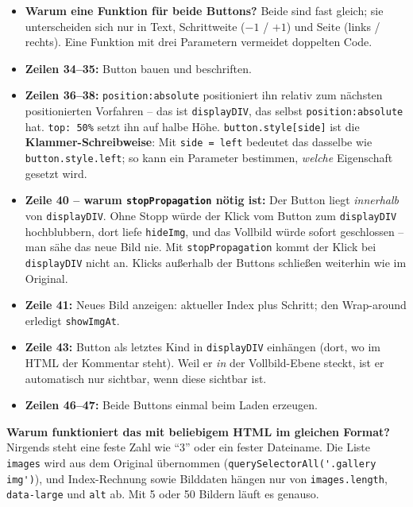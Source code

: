 \documentclass[a4paper,11pt]{article}
\begin{document}
\begin{itemize}
\item \textbf{Warum eine Funktion für beide Buttons?} Beide sind fast gleich; sie unterscheiden sich nur in Text,
      Schrittweite ($-1$ / $+1$) und Seite (links / rechts). Eine Funktion mit drei Parametern vermeidet doppelten Code.
\item \textbf{Zeilen 34--35:} Button bauen und beschriften.
\item \textbf{Zeilen 36--38:} \texttt{position:absolute} positioniert ihn relativ zum nächsten positionierten Vorfahren
      -- das ist \texttt{displayDIV}, das selbst \texttt{position:absolute} hat. \texttt{top: 50\%} setzt ihn auf halbe
      Höhe. \lstinline|button.style[side]| ist die \textbf{Klammer-Schreibweise}: Mit \texttt{side = \textquotedbl{}left\textquotedbl{}} bedeutet
      das dasselbe wie \lstinline|button.style.left|; so kann ein Parameter bestimmen, \emph{welche} Eigenschaft
      gesetzt wird.
\item \textbf{Zeile 40 -- warum \texttt{stopPropagation} nötig ist:} Der Button liegt \emph{innerhalb} von
      \texttt{displayDIV}. Ohne Stopp würde der Klick vom Button zum \texttt{displayDIV} hochblubbern, dort liefe
      \texttt{hideImg}, und das Vollbild würde sofort geschlossen -- man sähe das neue Bild nie. Mit
      \texttt{stopPropagation} kommt der Klick bei \texttt{displayDIV} nicht an. Klicks außerhalb der Buttons
      schließen weiterhin wie im Original.
\item \textbf{Zeile 41:} Neues Bild anzeigen: aktueller Index plus Schritt; den Wrap-around erledigt \texttt{showImgAt}.
\item \textbf{Zeile 43:} Button als letztes Kind in \texttt{displayDIV} einhängen (dort, wo im HTML der Kommentar steht).
      Weil er \emph{in} der Vollbild-Ebene steckt, ist er automatisch nur sichtbar, wenn diese sichtbar ist.
\item \textbf{Zeilen 46--47:} Beide Buttons einmal beim Laden erzeugen.
\end{itemize}

\textbf{Warum funktioniert das mit beliebigem HTML im gleichen Format?} Nirgends steht eine feste Zahl wie "`3"'
oder ein fester Dateiname. Die Liste \texttt{images} wird aus dem Original übernommen
(\lstinline|querySelectorAll('.gallery img')|), und Index-Rechnung sowie Bilddaten hängen nur von
\texttt{images.length}, \texttt{data-large} und \texttt{alt} ab. Mit 5 oder 50 Bildern läuft es genauso.
\end{document}

